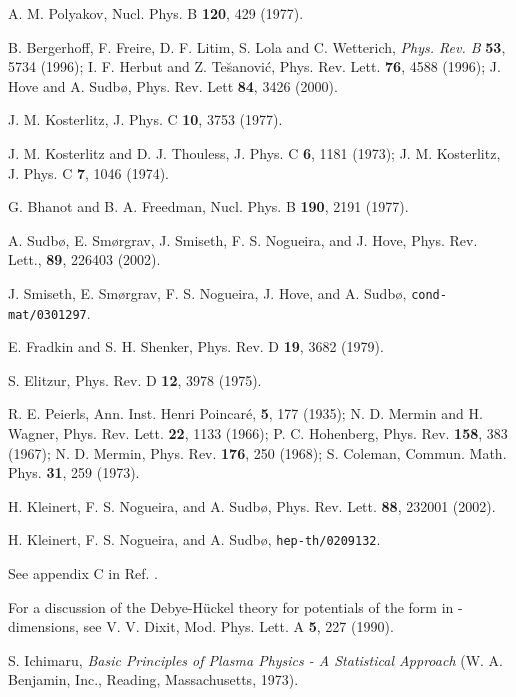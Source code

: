 \documentclass[a4paper,showpacs,preprintnumbers,amsmath,amssymb,prl,twocolumn]{revtex4}
\begin{document}
\begin{thebibliography}{100}

 A. M. Polyakov, Nucl. Phys. B {\bf 120}, 429
(1977).

 B. Bergerhoff, F. Freire, D. F. Litim, S. Lola and
C. Wetterich, {\it Phys. Rev. B} {\bf 53}, 5734 (1996); 
I. F. Herbut and Z. Te\u{s}anovi\'c,
Phys. Rev. Lett. {\bf 76}, 4588 (1996); J. Hove and A. Sudb{\o}, 
Phys. Rev. Lett {\bf 84}, 3426 (2000).

 J. M. Kosterlitz, J. Phys. C {\bf 10}, 3753 (1977).

 J. M. Kosterlitz and D. J. Thouless, 
J. Phys. C {\bf 6}, 1181 (1973); J. M. Kosterlitz, 
J. Phys. C {\bf 7}, 1046 (1974).

 G. Bhanot and B. A. Freedman, Nucl. Phys. B {\bf 190},
2191 (1977).

 A. Sudb{\o}, E. Sm{\o}rgrav, J. Smiseth, F. S. Nogueira,
and J. Hove, Phys. Rev. Lett., {\bf 89}, 226403 (2002). 
 
 J. Smiseth, E. Sm{\o}rgrav, F. S. Nogueira,
J. Hove, and A. Sudb{\o}, {\tt cond-mat/0301297}.

 E. Fradkin and S. H. Shenker, Phys. Rev. D
{\bf 19}, 3682 (1979).

 S. Elitzur, Phys. Rev. D {\bf 12}, 3978 (1975).

 R. E. Peierls, Ann. Inst. 
Henri Poincar{\'e}, {\bf 5}, 177 (1935);
N. D. Mermin and H. Wagner, Phys. Rev. Lett. {\bf 22}, 1133 (1966); 
P. C. Hohenberg, Phys. Rev. {\bf 158}, 383 (1967); 
N. D. Mermin, Phys. Rev. {\bf 176}, 250 (1968); 
S. Coleman, Commun. Math. Phys. {\bf 31}, 259 (1973).

 H. Kleinert, F. S. Nogueira, and A. Sudb{\o}, 
Phys. Rev. Lett. {\bf 88}, 232001 (2002).

 H. Kleinert, F. S. Nogueira, and A. Sudb{\o}, 
{\tt hep-th/0209132}. 

 See appendix C in Ref. \cite{KNS1}.

 For a discussion of the Debye-H\"uckel 
theory for potentials of the form \coordHE{} 
in \coordHE{}-dimensions, see 
V. V. Dixit, Mod. Phys. Lett. A {\bf 5}, 227 (1990).

 S. Ichimaru, {\it Basic Principles of Plasma 
Physics - A Statistical Approach} (W. A. Benjamin, Inc., Reading, 
Massachusetts, 1973).

\end{thebibliography}
\end{document}
